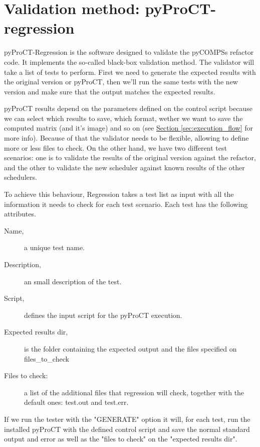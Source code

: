 \section{Validation method: pyProCT-regression}


pyProCT-Regression is the software designed to validate the pyCOMPSs refactor code. It implements the so-called black-box validation method. The validator will take a list of tests to perform. First we need to generate the expected results with the original version or pyProCT, then we'll run the same tests with the new version and make sure that the output matches the expected results.


pyProCT results depend on the parameters defined on the control script because we can select which results to save, which format, wether we want to save the computed matrix (and it's image) and so on (see \hyperref[sec:execution_flow]{Section \ref{sec:execution_flow}} for more info). Because of that the validator needs to be flexible, allowing to define more or less files to check. On the other hand, we have two different test scenarios: one is to validate the results of the original version against the refactor, and the other to validate the new scheduler against known results of the other schedulers.

To achieve this behaviour, Regression takes a test list as input with all the information it needs to check for each test scenario. 
Each test has the following attributes.

\begin{description}
\item [Name,] a unique test name.
\item [Description,] an small description of the test.
\item [Script,] defines the input script for the pyProCT execution. 
\item [Expected results dir,] is the folder containing the expected output and the files specified on files\_to\_check
\item [Files to check:] a list of the additional files that regression will check, together with the default ones: test.out and test.err.
\end{description}

If we run the tester with the "GENERATE" option it will, for each test, run the installed pyProCT with the defined control script and save the normal standard output and error as well as the "files to check" on the "expected results dir".

